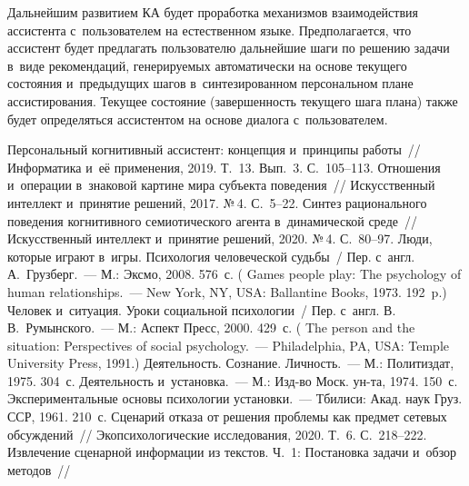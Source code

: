 \begin{multicols}{2}
  Дальнейшим развитием КА будет проработка 
механизмов взаимодействия ас\-сис\-тен\-та с~пользователем на естественном языке. 
Предполагается, что ас\-сис\-тент будет предлагать пользователю дальнейшие 
шаги по решению задачи в~виде рекомендаций, генерируемых автоматически 
на основе текущего со\-сто\-яния и~предыдущих шагов в~синтезированном 
персональном плане ас\-сис\-ти\-ро\-ва\-ния. Текущее состояние (за\-вер\-шен\-ность 
текущего шага плана) также будет определяться ассистентом на основе диалога с~пользователем.
  
{\small\frenchspacing
 {%
 \begin{thebibliography}{99}
   Персональный 
когнитивный ассистент: концепция и~принципы работы~// Информатика и~её применения, 
2019. Т.~13. Вып.~3. С.~105--113.
   Отношения и~операции в~знаковой картине мира 
субъекта поведения~// Искусственный интеллект и~принятие решений, 2017. №\,4. С.~5--22.
   Синтез рационального поведения когнитивного 
семиотического агента в~динамической среде~// Искусственный интеллект и~принятие 
решений, 2020. №\,4. С.~80--97.
   Люди, которые играют в~игры. Психология человеческой судьбы~/ Пер. 
  с~англ. А.~Грузберг.~--- М.: Эксмо, 2008. 576~с.
  (  Games people play: The psychology of human relationships.~--- New York, 
NY, USA: Ballantine Books, 1973. 192~p.)
   Человек и~ситуация. Уроки социальной психологии~/ Пер. 
с~англ. В.\,В.~Румынского.~--- М.: Аспект Пресс, 2000. 429~с. ( The 
person and the situation: Perspectives of social psychology.~--- Philadelphia, PA, USA:  
Temple University Press, 1991.)
   Деятельность. Сознание. Личность.~--- М.: Политиздат, 1975. 304~с.
   Деятельность и~установка.~--- М.: Изд-во Моск. ун-та, 1974. 150~с.
   Экспериментальные основы психологии установки.~--- Тбилиси: 
Акад. наук Груз. ССР, 1961. 210~с.
  Сценарий отказа от решения проблемы как 
предмет сетевых обсуждений~// Экопсихологические исследования, 2020. Т.~6. С.~218--222.
   Извлечение 
сценарной информации из текстов. Ч.~1: Постановка задачи и~обзор методов~// 

\end{thebibliography}}}
\end{multicols}
